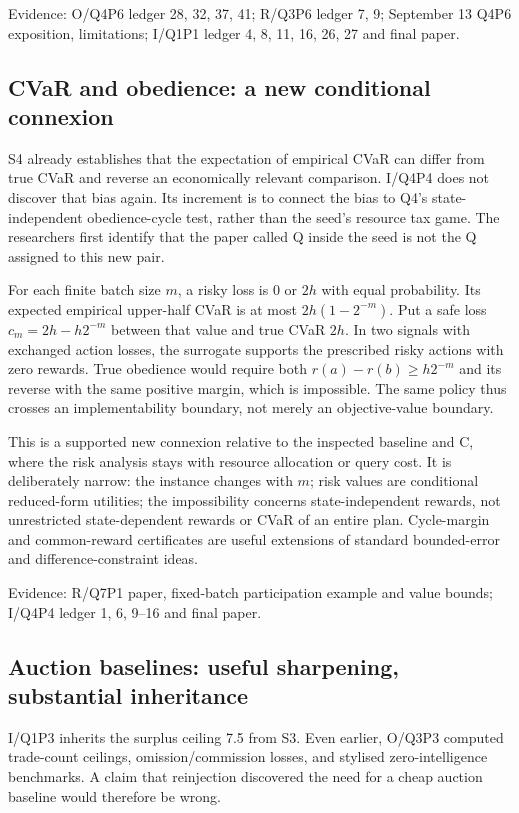 \documentclass[11pt,a4paper]{article}
\newcommand{\ev}[1]{{\small\textsf{Evidence:} #1}}
\begin{document}
\ev{O/Q4P6 ledger 28, 32, 37, 41; R/Q3P6 ledger 7, 9;
September 13 Q4P6 exposition, limitations;
I/Q1P1 ledger 4, 8, 11, 16, 26, 27 and final paper.}

\subsection{CVaR and obedience: a new conditional connexion}

S4 already establishes that the expectation of empirical CVaR can differ
from true CVaR and reverse an economically relevant comparison. I/Q4P4
does not discover that bias again. Its increment is to connect the bias to
Q4's state-independent obedience-cycle test, rather than the seed's resource
tax game. The researchers first identify that the paper called Q inside
the seed is not the Q assigned to this new pair.

For each finite batch size $m$, a risky loss is 0 or $2h$ with equal
probability. Its expected empirical upper-half CVaR is at most
$2h(1-2^{-m})$. Put a safe loss $c_m=2h-h2^{-m}$ between that value and
true CVaR $2h$. In two signals with exchanged action losses, the surrogate
supports the prescribed risky actions with zero rewards. True obedience
would require both $r(a)-r(b)\geq h2^{-m}$ and its reverse with the same
positive margin, which is impossible. The same policy thus crosses an
implementability boundary, not merely an objective-value boundary.

This is a supported new connexion relative to the inspected baseline and
C, where the risk analysis stays with resource allocation or query cost.
It is deliberately narrow: the instance changes with $m$; risk values are
conditional reduced-form utilities; the impossibility concerns
state-independent rewards, not unrestricted state-dependent rewards or
CVaR of an entire plan. Cycle-margin and common-reward certificates are
useful extensions of standard bounded-error and difference-constraint ideas.

\ev{R/Q7P1 paper, fixed-batch participation example and value bounds;
I/Q4P4 ledger 1, 6, 9--16 and final paper.}

\subsection{Auction baselines: useful sharpening, substantial inheritance}

I/Q1P3 inherits the surplus ceiling 7.5 from S3. Even earlier, O/Q3P3
computed trade-count ceilings, omission/commission losses, and stylised
zero-intelligence benchmarks. A claim that reinjection discovered the need
for a cheap auction baseline would therefore be wrong.
\end{document}
